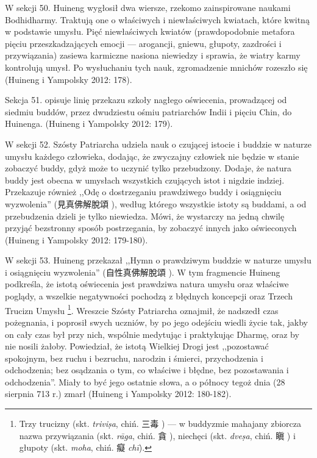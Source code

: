 W sekcji 50. Huineng wygłosił dwa wiersze, rzekomo zainspirowane naukami Bodhidharmy.
Traktują one o właściwych i niewłaściwych kwiatach, które kwitną w podstawie umysłu.
Pięć niewłaściwych kwiatów (prawdopodobnie metafora pięciu przeszkadzających emocji --- arogancji, gniewu, głupoty, zazdrości i przywiązania) zasiewa karmiczne nasiona niewiedzy i sprawia, że wiatry karmy kontrolują umysł.
Po wysłuchaniu tych nauk, zgromadzenie mnichów rozeszło się
(Huineng i Yampolsky 2012: 178).

Sekcja 51. opisuje linię przekazu szkoły nagłego oświecenia, prowadzącej od siedmiu buddów, przez dwudziestu ośmiu patriarchów Indii i pięciu Chin, do Huinenga.
(Huineng i Yampolsky 2012: 179).

W sekcji 52. Szósty Patriarcha udziela nauk o czującej istocie i buddzie w naturze umysłu każdego człowieka, dodając, że zwyczajny człowiek nie będzie w stanie zobaczyć buddy, gdyż może to uczynić tylko przebudzony.
Dodaje, że natura buddy jest obecna w umysłach wszystkich czujących istot i nigdzie indziej.
Przekazuje również ,,Odę o dostrzeganiu prawdziwego buddy i osiągnięciu wyzwolenia'' (見真佛解脫頌 ), według którego wszystkie istoty są buddami, a od przebudzenia dzieli je tylko niewiedza.
Mówi, że wystarczy na jedną chwilę przyjąć bezstronny sposób postrzegania, by zobaczyć innych jako oświeconych
(Huineng i Yampolsky 2012: 179-180).

W sekcji 53. Huineng przekazał ,,Hymn o prawdziwym buddzie w naturze umysłu i osiągnięciu wyzwolenia'' (自性真佛解脫頌 ).
W tym fragmencie Huineng podkreśla, że istotą oświecenia jest prawdziwa natura umysłu oraz właściwe poglądy, a wszelkie negatywności pochodzą z błędnych koncepcji oraz Trzech Trucizn Umysłu%
\footnote{Trzy trucizny\label{SanDu} (skt. \textit{trivi\d{s}a}, chiń. 三毒 ) --- w buddyzmie mahajany zbiorcza nazwa przywiązania (skt. \textit{rāga}, chiń. 貪 ), niechęci (skt. \textit{dve\d{s}a}, chiń. 瞋 ) i głupoty (skt. \textit{moha}, chiń. 癡 \textit{chī}).}.
Wreszcie Szósty Patriarcha oznajmił, że nadszedł czas pożegnania, i poprosił swych uczniów, by po jego odejściu wiedli życie tak, jakby on cały czas był przy nich, wspólnie medytując i praktykując Dharmę, oraz by nie nosili żałoby.
Powiedział, że istotą Wielkiej Drogi jest ,,pozostawać spokojnym, bez ruchu i bezruchu, narodzin i śmierci, przychodzenia i odchodzenia; bez osądzania o tym, co właściwe i błędne, bez pozostawania i odchodzenia''.
Miały to być jego ostatnie słowa, a o północy tegoż dnia (28 sierpnia 713 r.) zmarł
(Huineng i Yampolsky 2012: 180-182).

